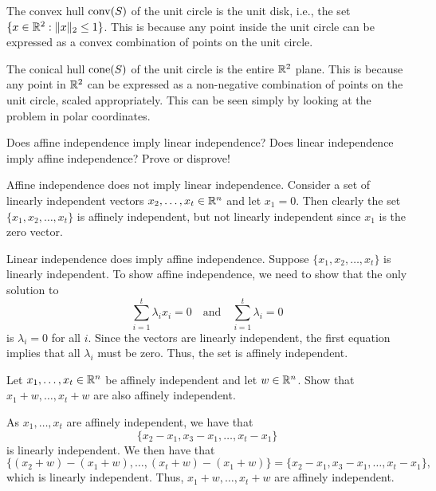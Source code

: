 \begin{solution}
  The convex hull $\operatorname*{conv}(S)$ of the unit circle is the unit disk, i.e., the set $\{ x \in \mathbb{R}^2 : \lVert x\rVert_2 \leq 1 \}$.
  This is because any point inside the unit circle can be expressed as a convex combination of points on the unit circle.

  The conical hull $\operatorname*{cone}(S)$ of the unit circle is the entire $\mathbb{R}^2$ plane.
  This is because any point in $\mathbb{R}^2$ can be expressed as a non-negative combination of points on the unit circle, scaled appropriately.
  This can be seen simply by looking at the problem in polar coordinates.
\end{solution}

\begin{exercise}
  Does affine independence imply linear independence?
  Does linear independence imply affine independence?
  Prove or disprove!
\end{exercise}

\begin{solution}
  Affine independence does not imply linear independence.
  Consider a set of linearly independent vectors $x_2, \ldots, x_t \in \mathbb{R}^n$ and let $x_1 = 0$.
  Then clearly the set $\{x_1, x_2, \ldots, x_t\}$ is affinely independent, but not linearly independent since $x_1$ is the zero vector.

  Linear independence does imply affine independence.
  Suppose $\{x_1, x_2, \ldots, x_t\}$ is linearly independent.
  To show affine independence, we need to show that the only solution to
  \begin{equation}
    \sum_{i=1}^t \lambda_i x_i = 0 \quad \text{and} \quad \sum_{i=1}^t \lambda_i = 0
  \end{equation}
  is $\lambda_i = 0$ for all $i$.
  Since the vectors are linearly independent, the first equation implies that all $\lambda_i$ must be zero.
  Thus, the set is affinely independent.
\end{solution}

\begin{exercise}
  Let $x_1, \ldots, x_t \in \mathbb{R}^n$ be affinely independent and let $w \in \mathbb{R}^n$.
  Show that $x_1 + w, \ldots, x_t + w$ are also affinely independent.
\end{exercise}

\begin{solution}
  As $x_1, \ldots, x_t$ are affinely independent, we have that
  \begin{equation}
    \{ x_2 - x_1, x_3 - x_1, \ldots, x_t - x_1 \}
  \end{equation}
  is linearly independent.
  We then have that
  \begin{equation}
    \{ (x_2 + w) - (x_1 + w), \ldots, (x_t + w) - (x_1 + w) \}
    = \{ x_2 - x_1, x_3 - x_1, \ldots, x_t - x_1 \},
  \end{equation}
  which is linearly independent.
  Thus, $x_1 + w, \ldots, x_t + w$ are affinely independent.
\end{solution}

